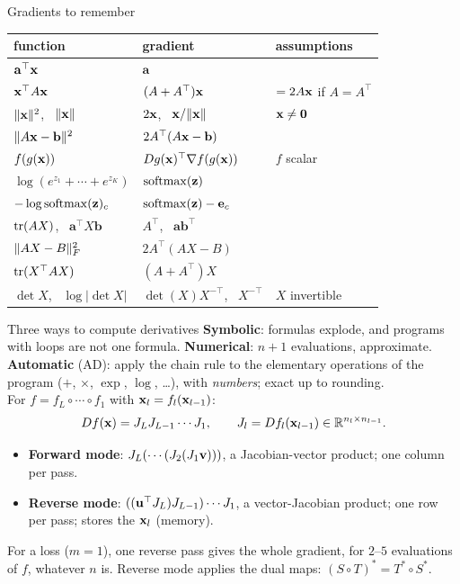 \documentclass[aspectratio=1610,11pt]{beamer}
\begin{document}
\begin{frame}{Gradients to remember}
    \centering\small
    \renewcommand{\arraystretch}{1.3}
    \begin{tabular}{@{}lll@{}}
        \toprule
        function & gradient & assumptions \\
        \midrule
        $\mathbf{a}^\top\mathbf{x}$ & $\mathbf{a}$ & \\
        $\mathbf{x}^\top A\mathbf{x}$ & $(A + A^\top)\mathbf{x}$ & $= 2A\mathbf{x}$ if $A = A^\top$ \\
        $\lVert \mathbf{x} \rVert^2$, \ $\lVert \mathbf{x} \rVert$ & $2\mathbf{x}$, \ $\mathbf{x}/\lVert \mathbf{x} \rVert$ & $\mathbf{x} \neq \mathbf{0}$ \\
        $\lVert A\mathbf{x} - \mathbf{b} \rVert^2$ & $2A^\top(A\mathbf{x} - \mathbf{b})$ & \\
        $f(g(\mathbf{x}))$ & $Dg(\mathbf{x})^\top\nabla f(g(\mathbf{x}))$ & $f$ scalar \\
        $\log(e^{z_1} + \cdots + e^{z_K})$ & $\operatorname{softmax}(\mathbf{z})$ & \\
        $-\log\operatorname{softmax}(\mathbf{z})_c$ & $\operatorname{softmax}(\mathbf{z}) - \mathbf{e}_c$ & \\
        $\operatorname{tr}(AX)$, \ $\mathbf{a}^\top X\mathbf{b}$ & $A^\top$, \ $\mathbf{a}\mathbf{b}^\top$ & \\
        $\lVert AX - B \rVert_F^2$ & $2A^\top(AX - B)$ & \\
        $\operatorname{tr}(X^\top AX)$ & $(A + A^\top)X$ & \\
        $\det X$, \ $\log|\det X|$ & $\det(X)X^{-\top}$, \ $X^{-\top}$ & $X$ invertible \\
        \bottomrule
    \end{tabular}
\end{frame}


\begin{frame}{Three ways to compute derivatives}
    \small
    \textbf{Symbolic}: formulas explode, and programs with loops are not one formula. \textbf{Numerical}: $n + 1$ evaluations, approximate. \textbf{Automatic} (AD): apply the chain rule to the elementary operations of the program ($+$, $\times$, $\exp$, $\log$, \dots), with \emph{numbers}; exact up to rounding.
    \\[0.4em]
    For $f = f_L \circ \cdots \circ f_1$ with $\mathbf{x}_l = f_l(\mathbf{x}_{l-1})$:
    \[Df(\mathbf{x}) = J_LJ_{L-1}\cdots J_1, \qquad J_l = Df_l(\mathbf{x}_{l-1}) \in \mathbb{R}^{n_l \times n_{l-1}}.\]
    \begin{itemize}
        \item \textbf{Forward mode}: $J_L(\cdots(J_2(J_1\mathbf{v})))$, a Jacobian-vector product; one column per pass.
        \item \textbf{Reverse mode}: $((\mathbf{u}^\top J_L)J_{L-1})\cdots J_1$, a vector-Jacobian product; one row per pass; stores the $\mathbf{x}_l$ (memory).
    \end{itemize}
    For a loss ($m = 1$), one reverse pass gives the whole gradient, for $2$--$5$ evaluations of $f$, whatever $n$ is. Reverse mode applies the dual maps: $(S \circ T)^* = T^* \circ S^*$.
\end{frame}
\end{document}

